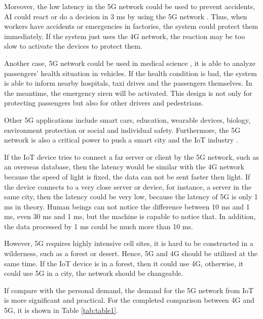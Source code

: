 \documentclass[conference]{IEEEtran}
\begin{document}
Moreover, the low latency in the 5G network could be used to prevent accidents, AI could react or do a decision in 3 ms by using the 5G network \cite{12}. Thus, when workers have accidents or emergencies in factories, the system could protect them immediately. If the system just uses the 4G network, the reaction may be too slow to activate the devices to protect them.

Another case, 5G network could be used in medical science \cite{13}, it is able to analyze passengers’ health situation in vehicles. If the health condition is bad, the system is able to inform nearby hospitals, taxi drives and the passengers themselves. In the meantime, the emergency siren will be activated. This design is not only for protecting passengers but also for other drivers and pedestrians.

Other 5G applications include smart cars, education, wearable devices, biology, environment protection or social and individual safety. Furthermore, the 5G network is also a critical power to push a smart city and the IoT industry \cite{14}.

If the IoT device tries to connect a far server or client by the 5G network, such as an overseas database, then the latency would be similar with the 4G network because the speed of light is fixed, the data can not be sent faster then light. If the device connects to a very close server or device, for instance, a server in the same city, then the latency could be very low, because the latency of 5G is only 1 ms in theory. Human beings can not notice the difference between 10 ms and 1 ms, even 30 ms and 1 ms, but the machine is capable to notice that. In addition, the data processed by 1 ms could be much more than 10 ms.

However, 5G requires highly intensive cell sites, it is hard to be constructed in a wilderness, such as a forest or desert. Hence, 5G and 4G should be utilized at the same time. If the IoT device is in a forest, then it could use 4G, otherwise, it could use 5G in a city, the network should be changeable.

If compare with the personal demand, the demand for the 5G network from IoT is more significant and practical. For the completed comparison between 4G and 5G, it is shown in Table \ref{tab:table1}.
\end{document}
